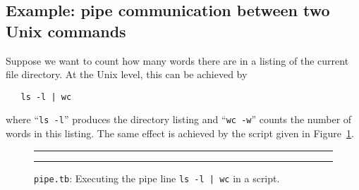 \subsection{\label{Ex-pipe}Example: pipe communication between two Unix commands}
Suppose we want to count how many words there are in a listing of the
current file directory. At the Unix level, this can be achieved by
\begin{verbatim}
   ls -l | wc
\end{verbatim}
where ``{\tt ls -l}'' produces the directory listing and
``{\tt wc -w}'' counts the number of words in this listing.
The same effect is achieved by the script given in Figure~\ref{fig:pipe.tb}.

\begin{figure}[tb]
\rule{\textwidth}{0.5mm}

  \caption{{\tt pipe.tb}: Executing the pipe line {\tt ls -l | wc} in a script.}
  \label{fig:pipe.tb}
\rule{\textwidth}{0.5mm}
\end{figure}
